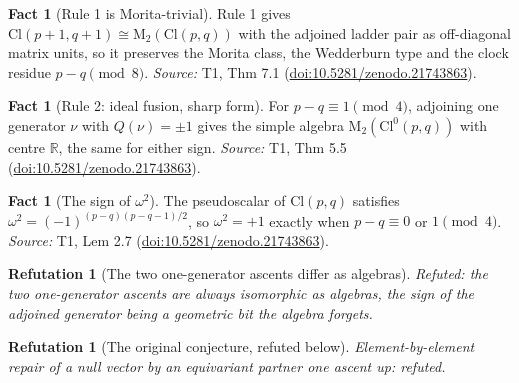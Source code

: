 \documentclass[11pt]{article}
\newtheorem{refutation}[theorem]{Refutation}
\theoremstyle{definition}
\newtheorem{fact}[theorem]{Fact}
\theoremstyle{plain}
\providecommand{\Cl}{}\renewcommand{\Cl}{\mathrm{Cl}}
\providecommand{\Mat}{}\renewcommand{\Mat}{\mathrm{M}}
\providecommand{\R}{}\renewcommand{\R}{\mathbb{R}}
\begin{document}
\begin{fact}[Rule 1 is Morita-trivial]\label{c:transport.rule-1-morita-trivial}
Rule 1 gives $\Cl(p+1, q+1) \cong \Mat_2(\Cl(p,q))$ with the adjoined ladder pair as off-diagonal matrix units, so it preserves the Morita class, the Wedderburn type and the clock residue $p - q \pmod 8$.
\emph{Source:} T1, Thm 7.1 (\href{https://doi.org/10.5281/zenodo.21743863}{doi:10.5281/zenodo.21743863}).
\end{fact}

\begin{fact}[Rule 2: ideal fusion, sharp form]\label{c:transport.rule-2-ideal-fusion-sharp-form}
For $p - q \equiv 1 \pmod 4$, adjoining one generator $\nu$ with $Q(\nu) = \pm 1$ gives the simple algebra $\Mat_2(\Cl^0(p,q))$ with centre $\R$, the same for either sign.
\emph{Source:} T1, Thm 5.5 (\href{https://doi.org/10.5281/zenodo.21743863}{doi:10.5281/zenodo.21743863}).
\end{fact}

\begin{fact}[The sign of $\omega^2$]\label{c:transport.sign}
The pseudoscalar of $\Cl(p,q)$ satisfies $\omega^2 = (-1)^{(p-q)(p-q-1)/2}$, so $\omega^2 = +1$ exactly when $p - q \equiv 0$ or $1 \pmod 4$.
\emph{Source:} T1, Lem 2.7 (\href{https://doi.org/10.5281/zenodo.21743863}{doi:10.5281/zenodo.21743863}).
\end{fact}

\begin{refutation}[The two one-generator ascents differ as algebras]\label{c:refuted.the-two-one-generator-ascents-differ-as-algebras}
Refuted: the two one-generator ascents are always isomorphic as algebras, the sign of the adjoined generator being a geometric bit the algebra forgets.
\end{refutation}

\begin{refutation}[The original conjecture, refuted below]\label{c:transport.original-conjecture-refuted-below}
Element-by-element repair of a null vector by an equivariant partner one ascent up: refuted.
\end{refutation}
\end{document}
